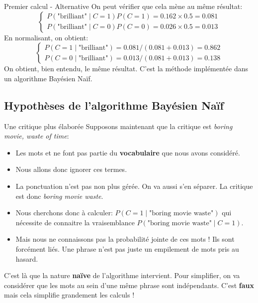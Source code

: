 \documentclass[10pt]{beamer}  %
\begin{document}
\begin{frame}{Premier calcul - Alternative}
	On peut vérifier que cela mène au même résultat:
	\begin{equation}
		\begin{cases}
			P(\text{"brilliant"} \mid C = 1) P(C=1) = 0.162 \times 0.5 = 0.081 \\
			P(\text{"brilliant"} \mid C = 0) P(C=0) = 0.026 \times 0.5 = 0.013
		\end{cases}
		\nonumber
	\end{equation}	
	En normalisant, on obtient:
	\begin{equation}
		\begin{cases}
			P(C = 1 \mid \text{"brilliant"}) = 0.081 / (0.081 + 0.013) =  0.862 \\
			P(C = 0 \mid \text{"brilliant"}) = 0.013 / (0.081 + 0.013) =  0.138
		\end{cases}
		\nonumber
	\end{equation}
	On obtient, bien entendu, le même résultat. C'est la méthode implémentée dans un algorithme Bayésien Naïf.
\end{frame}

\subsection[Hypothèses de l'algorithme Bayésien Naïf]{Hypothèses de l'algorithme Bayésien Naïf}

\begin{frame}{Une critique plus élaborée}
	Supposons maintenant que la critique est \textit{boring movie, waste of time}:
	\begin{itemize}
		\item Les mots  et  ne font pas partie du \textbf{vocabulaire} que nous avons considéré.
		\pause
		\item Nous allons donc ignorer ces termes.
		\pause
		\item La ponctuation n'est pas non plus gérée. On va aussi s'en séparer. La critique est donc \textit{boring movie waste}.
		\pause
		\item Nous cherchons donc à calculer: $P(C = 1 \mid \text{"boring movie waste"})$ qui nécessite de connaitre la vraisemblance $P(\text{"boring movie waste"} \mid C = 1)$.
		\pause
		\item Mais nous ne connaissons pas la probabilité jointe de ces mots ! Ils sont forcément liés. Une phrase n'est pas juste un empilement de mots pris au hasard.
	\end{itemize}
	\pause
	C'est là que la nature \textbf{naïve} de l'algorithme intervient. Pour simplifier, on va considérer que les mots au sein d'une même phrase sont indépendants. C'est \textbf{faux} mais cela simplifie grandement les calculs !
\end{frame}
\end{document}
